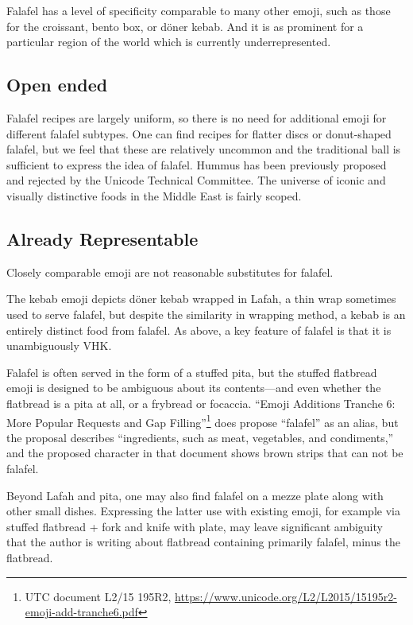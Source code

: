 \documentclass[a4paper,10pt]{article}
\begin{document}
{\sc Falafel} has a level of specificity comparable to many other emoji, such as those
for the croissant, bento box, or döner kebab. And it is as prominent for a particular
region of the world which is currently underrepresented.

\subsection{Open ended}

Falafel recipes are largely uniform, so there is no need for additional emoji for
different falafel subtypes. One can find recipes for flatter discs or donut-shaped
falafel, but we feel that these are relatively uncommon and the traditional ball is
sufficient to express the idea of falafel.
{\sc Hummus} has been previously proposed and rejected
by the Unicode Technical Committee. The universe of iconic and visually distinctive
foods in the Middle East is fairly scoped.

\subsection{Already Representable}

Closely comparable emoji are not reasonable substitutes for falafel.

The {\sc kebab} emoji depicts döner kebab wrapped in Lafah, a thin wrap sometimes used to serve
falafel, but despite the similarity in wrapping method, a kebab is an entirely distinct food from falafel.
As above, a key feature of falafel is that it is unambiguously VHK.

Falafel is often served in the form of a stuffed pita, but the {\sc stuffed flatbread}
emoji is designed to be ambiguous about its contents---and even whether the flatbread is a
pita at all, or a frybread or focaccia. ``Emoji Additions Tranche 6: More
Popular Requests and Gap Filling''\footnote{UTC document L2/15 195R2, \url{https://www.unicode.org/L2/L2015/15195r2-emoji-add-tranche6.pdf}} does propose ``falafel'' as an alias,
but the proposal describes ``ingredients, such as meat, vegetables, and condiments,''
and the proposed character in that document shows brown strips that can not be falafel.

Beyond Lafah and pita, one may also find falafel on a mezze plate along with other small
dishes. Expressing the latter use with existing emoji, for example via
{\sc stuffed flatbread + fork and knife with plate}, may leave significant ambiguity that
the author is writing about flatbread containing primarily falafel, minus the flatbread.
\end{document}
